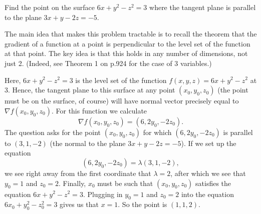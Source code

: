 \begin{problem}
  Find the point on the surface $6x+y^2-z^2=3$ where the tangent plane is parallel to the plane $3x+y-2z=-5$.
\end{problem}
\begin{solution}
  The main idea that makes this problem tractable is to recall the theorem that the gradient of a function at a point is perpendicular to the level set of the function at that point. The key idea is that this holds in any number of dimensions, not just 2. (Indeed, see Theorem 1 on p.924 for the case of 3 variables.)

  Here, $6x+y^2-z^2=3$ is the level set of the function $f(x,y,z)=6x+y^2-z^2$ at 3. Hence, the tangent plane to this surface at any point $(x_0,y_0,z_0)$ (the point must be on the surface, of course) will have normal vector precisely equal to $\nabla f(x_0,y_0,z_0)$. For this function we calculate
  \[\nabla f(x_0,y_0,z_0)=(6,2y_0,-2z_0).\]
  The question asks for the point $(x_0,y_0,z_0)$ for which $(6,2y_0,-2z_0)$ is parallel to $(3,1,-2)$ (the normal to the plane $3x+y-2z=-5$). If we set up the equation
  \[(6,2y_0,-2z_0)=\lambda (3,1,-2),\]
  we see right away from the first coordinate that $\lambda=2$, after which we see that $y_0=1$ and $z_0=2$. Finally, $x_0$ must be such that $(x_0,y_0,z_0)$ satisfies the equation $6x+y^2-z^2=3$. Plugging in $y_0=1$ and $z_0=2$ into the equation $6x_0+y_0^2-z_0^2=3$ gives us that $x=1$. So the point is $(1,1,2)$.
\end{solution}

